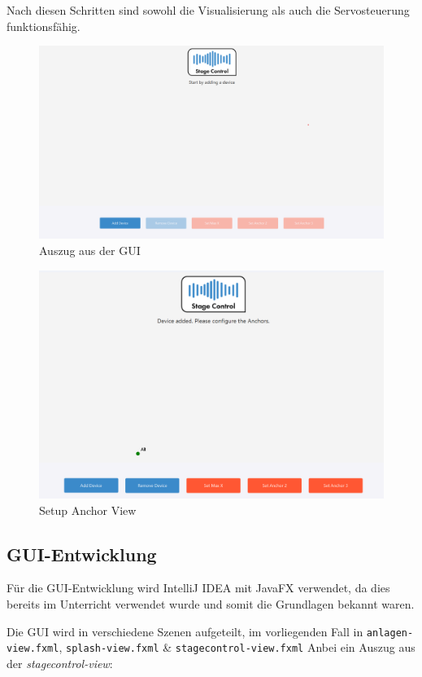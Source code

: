 Nach diesen Schritten sind sowohl die Visualisierung als auch die Servosteuerung funktionsfähig.

\begin{figure}[H]
	\centering
	\includegraphics[width=0.9\linewidth]{images/stagecontrol-overview.png}
	\caption[Auszug aus der GUI]{Auszug aus der GUI}
	\label{fig:StageControlOverview}
\end{figure}

\begin{figure}[H]
	\centering
	\includegraphics[width=0.9\linewidth]{images/stagecontrol-setupanchor.png}
	\caption[Setup Anchor View]{Setup Anchor View}
	\label{fig:StageControlSetupAnchor}
\end{figure}

\newpage
\subsection{GUI-Entwicklung}
Für die GUI-Entwicklung wird IntelliJ IDEA mit JavaFX verwendet, da dies bereits im Unterricht verwendet wurde und somit die Grundlagen bekannt waren.

Die GUI wird in verschiedene Szenen aufgeteilt, im vorliegenden Fall in \texttt{anlagen-view.fxml}, \texttt{splash-view.fxml} \& \texttt{stagecontrol-view.fxml}
Anbei ein Auszug aus der \textit{stagecontrol-view}:

